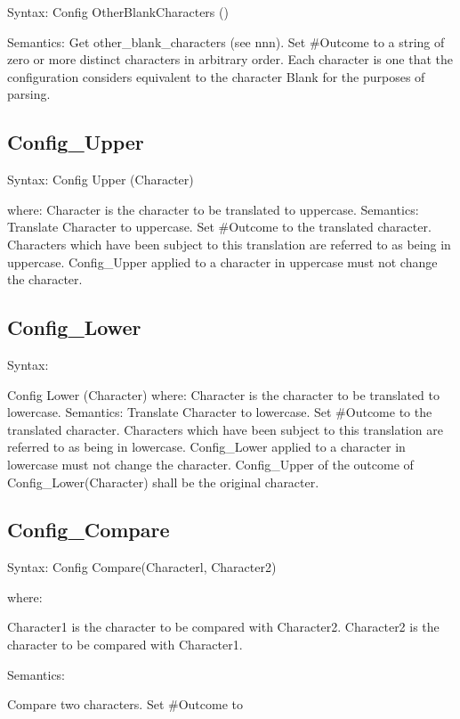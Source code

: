 Syntax: Config OtherBlankCharacters ()

Semantics: Get other\_blank\_characters (see nnn). Set \#Outcome to a
string of zero or more distinct characters in arbitrary order. Each
character is one that the configuration considers equivalent to the
character Blank for the purposes of parsing.

\hypertarget{config_upper}{%
\subsection{Config\_Upper}\label{config_upper}}

Syntax: Config Upper (Character)

where: Character is the character to be translated to uppercase.
Semantics: Translate Character to uppercase. Set \#Outcome to the
translated character. Characters which have been subject to this
translation are referred to as being in uppercase. Config\_Upper applied
to a character in uppercase must not change the character.

\hypertarget{config_lower}{%
\subsection{Config\_Lower}\label{config_lower}}

Syntax:

Config Lower (Character) where: Character is the character to be
translated to lowercase. Semantics: Translate Character to lowercase.
Set \#Outcome to the translated character. Characters which have been
subject to this translation are referred to as being in lowercase.
Config\_Lower applied to a character in lowercase must not change the
character. Config\_Upper of the outcome of Config\_Lower(Character)
shall be the original character.

\hypertarget{config_compare}{%
\subsection{Config\_Compare}\label{config_compare}}

Syntax: Config Compare(Characterl, Character2)

where:

Character1 is the character to be compared with Character2. Character2
is the character to be compared with Character1.

Semantics:

Compare two characters. Set \#Outcome to

